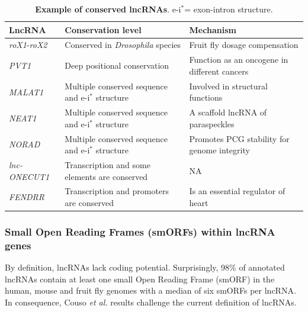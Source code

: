 \begin{table}[!htb]
  \caption[Example of conserved lncRNAs]{\textbf{Example of conserved lncRNAs}. e-i$^*$= exon-intron structure.}
  \begin{scriptsize}
    \begin{tabulary}{0.65\linewidth}{lll}
      \textbf{LncRNA} & \textbf{Conservation level} & \textbf{Mechanism} \\ \hline
      \textit{roX1}-\textit{roX2}\autocite{flintoft_2013_rox} & Conserved in \textit{Drosophila} species & Fruit fly dosage compensation \\
      \textit{PVT1}\autocite{hezroni_2015_principles} & Deep positional conservation & Function as an oncogene in different cancers \\
      \textit{MALAT1}\autocite{statello_2021_lncRNA_reg} & Multiple conserved sequence and e-i$^*$ structure & Involved in structural functions \\
      \textit{NEAT1}\autocite{ulitsky_2016_evolution,statello_2021_lncRNA_reg} & Multiple conserved sequence and e-i$^*$ structure & A scaffold lncRNA of paraspeckles \\
      \textit{NORAD}\autocite{ulitsky_2016_evolution} & Multiple conserved sequence and e-i$^*$ structure & Promotes PCG stability for genome integrity\\
      \textit{lnc-ONECUT1}\autocite{ulitsky_2016_evolution} & Transcription and some elements are conserved & NA \\
      \textit{FENDRR}\autocite{ulitsky_2016_evolution} & Transcription and promoters are conserved & Is an essential regulator of heart \\
    \end{tabulary}
  \end{scriptsize}
  \label{tab:lncRNA-conserved}
\end{table}

\subsubsection{Small Open Reading Frames (smORFs) within lncRNA genes}
\label{subsubsec:smORFS}

By definition, lncRNAs lack coding potential. Surprisingly, 98\% of annotated lncRNAs contain at least one small Open Reading Frame (smORF) in the human, mouse and fruit fly genomes with a median of six smORFs per lncRNA.\autocite{couso_2017_smORF} In consequence, Couso \textit{et al.} results challenge the current definition of lncRNAs.

